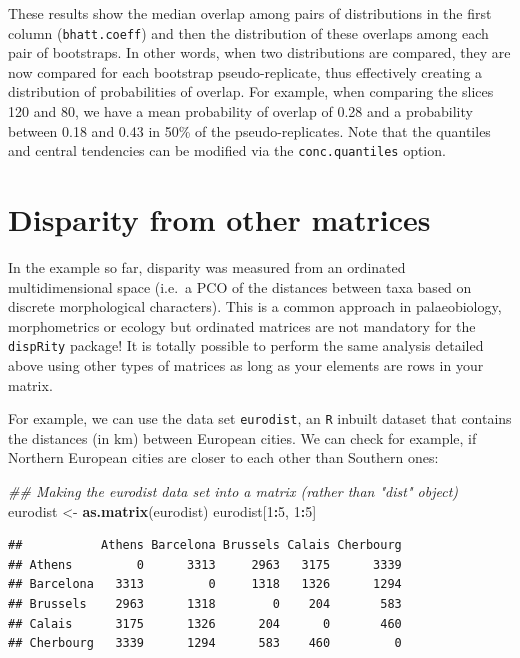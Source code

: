 \documentclass[]{book}
\newenvironment{Shaded}{\begin{snugshade}}{\end{snugshade}}
\newcommand{\CommentTok}[1]{\textcolor[rgb]{0.56,0.35,0.01}{\textit{#1}}}
\newcommand{\DecValTok}[1]{\textcolor[rgb]{0.00,0.00,0.81}{#1}}
\newcommand{\KeywordTok}[1]{\textcolor[rgb]{0.13,0.29,0.53}{\textbf{#1}}}
\newcommand{\NormalTok}[1]{#1}
\newcommand{\OperatorTok}[1]{\textcolor[rgb]{0.81,0.36,0.00}{\textbf{#1}}}
\newcommand{\StringTok}[1]{\textcolor[rgb]{0.31,0.60,0.02}{#1}}
\begin{document}
These results show the median overlap among pairs of distributions in the first column (\texttt{bhatt.coeff}) and then the distribution of these overlaps among each pair of bootstraps.
In other words, when two distributions are compared, they are now compared for each bootstrap pseudo-replicate, thus effectively creating a distribution of probabilities of overlap.
For example, when comparing the slices 120 and 80, we have a mean probability of overlap of 0.28 and a probability between 0.18 and 0.43 in 50\% of the pseudo-replicates.
Note that the quantiles and central tendencies can be modified via the \texttt{conc.quantiles} option.

\hypertarget{disparity-from-other-matrices}{%
\section{Disparity from other matrices}\label{disparity-from-other-matrices}}

In the example so far, disparity was measured from an ordinated multidimensional space (i.e.~a PCO of the distances between taxa based on discrete morphological characters).
This is a common approach in palaeobiology, morphometrics or ecology but ordinated matrices are not mandatory for the \texttt{dispRity} package!
It is totally possible to perform the same analysis detailed above using other types of matrices as long as your elements are rows in your matrix.

For example, we can use the data set \texttt{eurodist}, an \texttt{R} inbuilt dataset that contains the distances (in km) between European cities.
We can check for example, if Northern European cities are closer to each other than Southern ones:

\begin{Shaded}
\begin{Highlighting}[]
\CommentTok{## Making the eurodist data set into a matrix (rather than "dist" object)}
\NormalTok{eurodist <-}\StringTok{ }\KeywordTok{as.matrix}\NormalTok{(eurodist)}
\NormalTok{eurodist[}\DecValTok{1}\OperatorTok{:}\DecValTok{5}\NormalTok{, }\DecValTok{1}\OperatorTok{:}\DecValTok{5}\NormalTok{]}
\end{Highlighting}
\end{Shaded}

\begin{verbatim}
##           Athens Barcelona Brussels Calais Cherbourg
## Athens         0      3313     2963   3175      3339
## Barcelona   3313         0     1318   1326      1294
## Brussels    2963      1318        0    204       583
## Calais      3175      1326      204      0       460
## Cherbourg   3339      1294      583    460         0
\end{verbatim}
\end{document}
